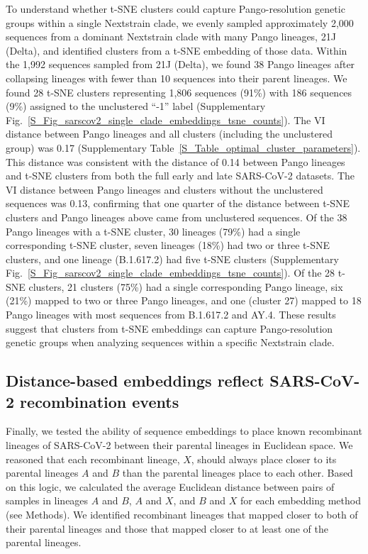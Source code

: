 \documentclass[webpdf,contemporary,large,single]{oup-authoring-template}%
\theoremstyle{thmstyleone}%
\theoremstyle{thmstyletwo}%
\theoremstyle{thmstylethree}%
\begin{document}
To understand whether t-SNE clusters could capture Pango-resolution genetic groups within a single Nextstrain clade, we evenly sampled approximately 2,000 sequences from a dominant Nextstrain clade with many Pango lineages, 21J (Delta), and identified clusters from a t-SNE embedding of those data.
Within the 1,992 sequences sampled from 21J (Delta), we found 38 Pango lineages after collapsing lineages with fewer than 10 sequences into their parent lineages.
We found 28 t-SNE clusters representing 1,806 sequences (91\%) with 186 sequences (9\%) assigned to the unclustered ``-1'' label (Supplementary Fig.~\ref{S_Fig_sarscov2_single_clade_embeddings_tsne_counts}).
The VI distance between Pango lineages and all clusters (including the unclustered group) was 0.17 (Supplementary Table~\ref{S_Table_optimal_cluster_parameters}).
This distance was consistent with the distance of 0.14 between Pango lineages and t-SNE clusters from both the full early and late SARS-CoV-2 datasets.
The VI distance between Pango lineages and clusters without the unclustered sequences was 0.13, confirming that one quarter of the distance between t-SNE clusters and Pango lineages above came from unclustered sequences.
Of the 38 Pango lineages with a t-SNE cluster, 30 lineages (79\%) had a single corresponding t-SNE cluster, seven lineages (18\%) had two or three t-SNE clusters, and one lineage (B.1.617.2) had five t-SNE clusters (Supplementary Fig.~\ref{S_Fig_sarscov2_single_clade_embeddings_tsne_counts}).
Of the 28 t-SNE clusters, 21 clusters (75\%) had a single corresponding Pango lineage, six (21\%) mapped to two or three Pango lineages, and one (cluster 27) mapped to 18 Pango lineages with most sequences from B.1.617.2 and AY.4.
These results suggest that clusters from t-SNE embeddings can capture Pango-resolution genetic groups when analyzing sequences within a specific Nextstrain clade.

\subsection{Distance-based embeddings reflect SARS-CoV-2 recombination events}

Finally, we tested the ability of sequence embeddings to place known recombinant lineages of SARS-CoV-2 between their parental lineages in Euclidean space.
We reasoned that each recombinant lineage, $X$, should always place closer to its parental lineages $A$ and $B$ than the parental lineages place to each other.
Based on this logic, we calculated the average Euclidean distance between pairs of samples in lineages $A$ and $B$, $A$ and $X$, and $B$ and $X$ for each embedding method (see Methods).
We identified recombinant lineages that mapped closer to both of their parental lineages and those that mapped closer to at least one of the parental lineages.
\end{document}
